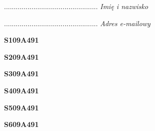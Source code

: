 \begin{turn}{90}\begin{minipage}{\linewidth} \vspace{20mm} ................................................  \textit{Imię i nazwisko}\end{minipage}\end{turn}

\begin{turn}{90}\begin{minipage}{\linewidth} \vspace{20mm} ................................................  \textit{Adres e-mailowy}\end{minipage}\end{turn}

\begin{turn}{90}\huge \begin{minipage}{\linewidth} \vspace{10mm}\textbf{S109A491}\end{minipage}\end{turn}

\begin{turn}{90}\huge \begin{minipage}{\linewidth} \vspace{10mm}\textbf{S209A491}\end{minipage}\end{turn}

\begin{turn}{90}\huge \begin{minipage}{\linewidth} \vspace{10mm}\textbf{S309A491}\end{minipage}\end{turn}

\begin{turn}{90}\huge \begin{minipage}{\linewidth} \vspace{10mm}\textbf{S409A491}\end{minipage}\end{turn}

\begin{turn}{90}\huge \begin{minipage}{\linewidth} \vspace{10mm}\textbf{S509A491}\end{minipage}\end{turn}

\begin{turn}{90}\huge \begin{minipage}{\linewidth} \vspace{10mm}\textbf{S609A491}\end{minipage}\end{turn}

